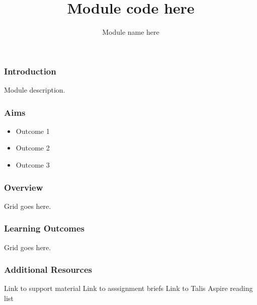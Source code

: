 \documentclass[handout, xcolor={dvipsnames}]{beamer}\usepackage{etoolbox}\newtoggle{printable}\toggletrue{printable}
\begin{document}
\title{Module code here}
\subtitle{Module name here}

\frame{\titlepage} 

\begin{frame}
	\frametitle{Introduction}

	Module description.	
	
\end{frame}

\begin{frame}
	\frametitle{Aims}
	\begin{itemize}
		\item Outcome 1
		\item Outcome 2
		\item Outcome 3
	\end{itemize}
\end{frame}

\begin{frame}
	\frametitle{Overview}
	
	Grid goes here.
\end{frame}

\begin{frame}
	\frametitle{Learning Outcomes}
	
	Grid goes here.
\end{frame}

\begin{frame}
	\frametitle{Additional Resources}
	
	Link to support material
	Link to asssignment briefs
	Link to Talis Aspire reading list
\end{frame}
\end{document}

